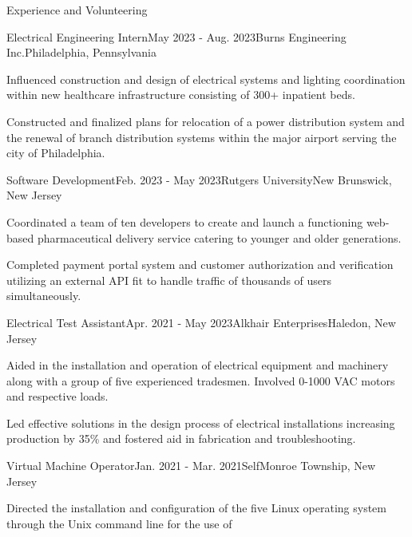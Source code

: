\documentclass{resume}
\begin{document}
    \begin{rSection}{Experience and Volunteering}
        \begin{rSubsection}{Electrical Engineering Intern}{May 2023 - Aug. 2023}{Burns Engineering Inc.}{Philadelphia, Pennsylvania}
            \item Influenced construction and design of electrical systems
                and lighting coordination within new healthcare infrastructure
                consisting of 300+ inpatient beds.
            \item Constructed and finalized plans for relocation of a power
                distribution system and the renewal of branch distribution
                systems within the major airport serving the city of
                Philadelphia.
        \end{rSubsection}
        \begin{rSubsection}{Software Development}{Feb. 2023 - May 2023}{Rutgers University}{New Brunswick, New Jersey}
            \item Coordinated a team of ten developers to create and launch a
                functioning web-based pharmaceutical delivery service catering
                to younger and older generations.
            \item Completed payment portal system and customer authorization
                and verification utilizing an external API fit to handle
                traffic of thousands of users simultaneously.
        \end{rSubsection}
        \begin{rSubsection}{Electrical Test Assistant}{Apr. 2021 - May 2023}{Alkhair Enterprises}{Haledon, New Jersey}
            \item Aided in the installation and operation of electrical
                equipment and machinery along with a group of five experienced
                tradesmen. Involved 0-1000 VAC motors and respective loads.
            \item Led effective solutions in the design process of electrical
                installations increasing production by 35\% and fostered aid in
                fabrication and troubleshooting.
        \end{rSubsection}
        \begin{rSubsection}{Virtual Machine Operator}{Jan. 2021 - Mar. 2021}{Self}{Monroe Township, New Jersey}
            \item Directed the installation and configuration of the five Linux
                operating system through the Unix command line for the use of

\end{rSubsection}
\end{rSection}
\end{document}
